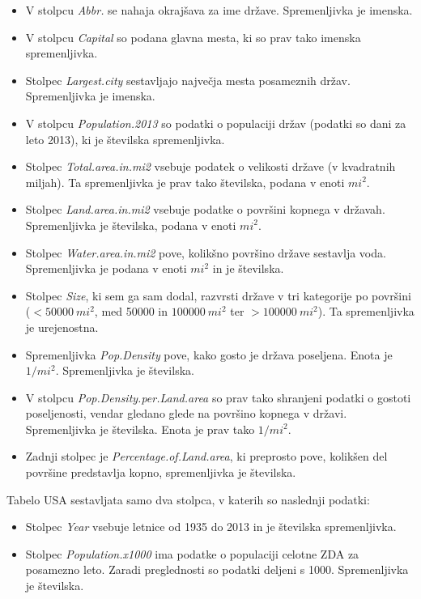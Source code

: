 \documentclass[11pt,a4paper]{article}
\begin{document}
\begin{itemize}
  \item V stolpcu \textit{Abbr.} se nahaja okrajšava za ime države. Spremenljivka je imenska.
  \item V stolpcu \textit{Capital} so podana glavna mesta, ki so prav tako imenska spremenljivka.
  \item Stolpec \textit{Largest.city} sestavljajo največja mesta posameznih držav. Spremenljivka je imenska.
  \item V stolpcu \textit{Population.2013} so podatki o populaciji držav (podatki so dani za leto 2013), ki je številska spremenljivka.
  \item Stolpec \textit{Total.area.in.mi2} vsebuje podatek o velikosti države (v kvadratnih miljah). Ta spremenljivka je prav tako številska, podana v enoti $mi^2$.
  \item Stolpec \textit{Land.area.in.mi2} vsebuje podatke o površini kopnega v državah. Spremenljivka je številska, podana v enoti $mi^2$. 
  \item Stolpec \textit{Water.area.in.mi2} pove, kolikšno površino države sestavlja voda.  Spremenljivka je podana v enoti $mi^2$ in je številska.
  \item Stolpec \textit{Size}, ki sem ga sam dodal, razvrsti države v tri kategorije po površini ($<50000~mi^2$, med 50000 in $100000~mi^2$ ter $>100000~mi^2$). Ta spremenljivka je urejenostna.
  \item Spremenljivka \textit{Pop.Density} pove, kako gosto je država poseljena. Enota je $1/mi^2$. Spremenljivka je številska.
  \item V stolpcu \textit{Pop.Density.per.Land.area} so prav tako shranjeni podatki o gostoti poseljenosti, vendar gledano glede na površino kopnega v državi. Spremenljivka je številska. Enota je prav tako $1/mi^2$.
  \item Zadnji stolpec je \textit{Percentage.of.Land.area}, ki preprosto pove, kolikšen del površine predstavlja kopno, spremenljivka je številska.
\end{itemize}

Tabelo USA sestavljata samo dva stolpca, v katerih so naslednji podatki:

\begin{itemize}
  \item Stolpec \textit{Year} vsebuje letnice od 1935 do 2013 in je številska spremenljivka.
  \item Stolpec \textit{Population.x1000} ima podatke o populaciji celotne ZDA za posamezno leto. Zaradi preglednosti so podatki deljeni s 1000. Spremenljivka je številska.
\end{itemize}
\end{document}
